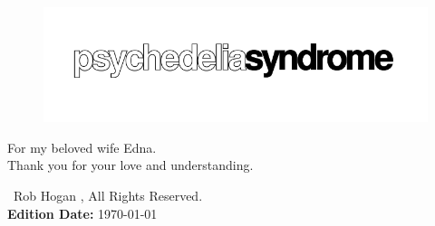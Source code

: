 
\thispagestyle{empty}%
\vspace*{\fill}
\begin{figure}[H]
    \centering
      \includegraphics[width=15cm]{src/cover/title_page.png}%
\end{figure}
\vspace*{\fill}

\clearpage
\thispagestyle{empty}%

\vspace*{\fill}
For my beloved wife Edna.\\
Thank you for your love and understanding.\\
\bigskip
\vspace*{\fill}

\textcopyright\ Rob Hogan \the\year{}, All Rights Reserved. \\
\textbf{Edition Date:} \today

\doclicenseThis
\clearpage
